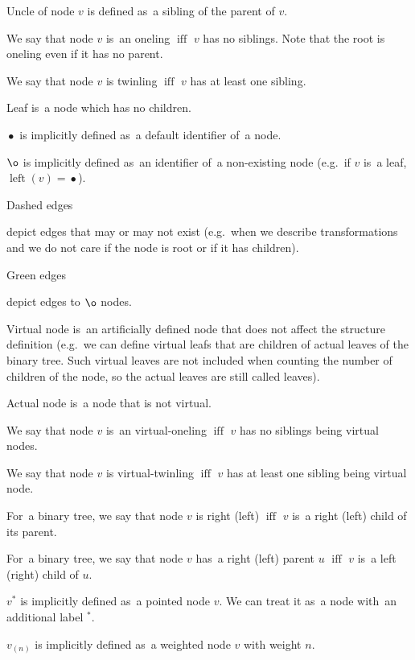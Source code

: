 \documentclass[final]{article}
\theoremstyle{definition}
\theoremstyle{definition}
\theoremstyle{remark}
\newcommand{\pointed}[1]{\ensuremath{{#1}^*}}
\newcommand{\weighted}[1]{\ensuremath{_{(#1)}}}
\DeclareMathOperator{\textiff}{\text{iff}}
\DeclareMathOperator{\tleft}{\text{left}}
\DeclareMathOperator{\n}{\bullet}
\DeclareMathOperator{\no}{\o}
\begin{document}
Uncle of node \(v\) is defined as~a sibling of the parent of \(v\).

We say that node \(v\) is~an oneling \(\textiff\) \(v\) has no siblings. Note that the root is oneling even if it has no parent.

We say that node \(v\) is twinling \(\textiff\) \(v\) has at least one sibling.

Leaf is~a node which has no children.

\(\n\) is implicitly defined as~a default identifier of~a node.

\(\no\) is implicitly defined as~an identifier of~a non-existing node (e.g.~if \(v\) is~a leaf, \(\tleft(v) = \n\)).

Dashed edges 
\begin{minipage}{1.5em}

\end{minipage}
depict edges that may or may not exist (e.g.~when we describe transformations and we do not care if the node is root or if it has children).

Green edges 
\begin{minipage}{1.5em}

\end{minipage}
depict edges to \(\no\) nodes.

Virtual node is~an artificially defined node that does not affect the structure definition (e.g.~we can define virtual leafs that are children of actual leaves of the binary tree. Such virtual leaves are not included when counting the number of children of the node, so the actual leaves are still called leaves).

Actual node is~a node that is not virtual.

We say that node \(v\) is~an virtual-oneling \(\textiff\) \(v\) has no siblings being virtual nodes.

We say that node \(v\) is virtual-twinling \(\textiff\) \(v\) has at least one sibling being virtual node.

For~a binary tree, we say that node \(v\) is right (left) \(\textiff\) \(v\) is~a right (left) child of its parent.

For~a binary tree, we say that node \(v\) has~a right (left) parent \(u\) \(\textiff\) \(v\) is~a left (right) child of \(u\).

\(\pointed{v}\) is implicitly defined as~a pointed node \(v\). We can treat it as~a node with~an additional label \(\pointed{}\).

\(v\weighted{n}\) is implicitly defined as~a weighted node \(v\) with weight \(n\).
\end{document}
